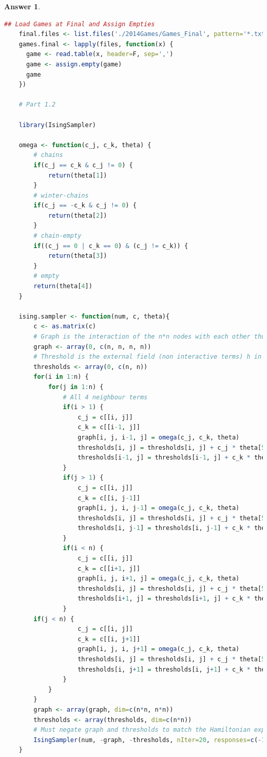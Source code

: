 \documentclass[12pt]{article}
\theoremstyle{colon}
\newtheorem*{answer}{Answer}
\begin{document}
\begin{answer}
\begin{lstlisting}[language=R, basicstyle=\scriptsize, breaklines=true]
    ## Load Games at Final and Assign Empties
    final.files <- list.files('./2014Games/Games_Final', pattern='*.txt', full.names=T, recursive=FALSE)
    games.final <- lapply(files, function(x) {
      game <- read.table(x, header=F, sep=',')
      game <- assign.empty(game)
      game
    })

    # Part 1.2

    library(IsingSampler)

    omega <- function(c_j, c_k, theta) {
        # chains
        if(c_j == c_k & c_j != 0) {
            return(theta[1])
        }
        # winter-chains
        if(c_j == -c_k & c_j != 0) {
            return(theta[2])
        }
        # chain-empty
        if((c_j == 0 | c_k == 0) & (c_j != c_k)) {
            return(theta[3])
        }
        # empty
        return(theta[4])
    }

    ising.sampler <- function(num, c, theta){
        c <- as.matrix(c)
        # Graph is the interaction of the n*n nodes with each other thus, dim = n*n x n*n
        graph <- array(0, c(n, n, n, n))
        # Threshold is the external field (non interactive terms) h in our case
        thresholds <- array(0, c(n, n))
        for(i in 1:n) {
            for(j in 1:n) {
                # All 4 neighbour terms
                if(i > 1) {
                    c_j = c[[i, j]]
                    c_k = c[[i-1, j]]
                    graph[i, j, i-1, j] = omega(c_j, c_k, theta)
                    thresholds[i, j] = thresholds[i, j] + c_j * theta[5]
                    thresholds[i-1, j] = thresholds[i-1, j] + c_k * theta[5]
                }
                if(j > 1) {
                    c_j = c[[i, j]]
                    c_k = c[[i, j-1]]
                    graph[i, j, i, j-1] = omega(c_j, c_k, theta)
                    thresholds[i, j] = thresholds[i, j] + c_j * theta[5]
                    thresholds[i, j-1] = thresholds[i, j-1] + c_k * theta[5]
                }
                if(i < n) {
                    c_j = c[[i, j]]
                    c_k = c[[i+1, j]]
                    graph[i, j, i+1, j] = omega(c_j, c_k, theta)
                    thresholds[i, j] = thresholds[i, j] + c_j * theta[5]
                    thresholds[i+1, j] = thresholds[i+1, j] + c_k * theta[5]
                }
        if(j < n) {
                    c_j = c[[i, j]]
                    c_k = c[[i, j+1]]
                    graph[i, j, i, j+1] = omega(c_j, c_k, theta)
                    thresholds[i, j] = thresholds[i, j] + c_j * theta[5]
                    thresholds[i, j+1] = thresholds[i, j+1] + c_k * theta[5]
                }
            }
        }
        graph <- array(graph, dim=c(n*n, n*n))
        thresholds <- array(thresholds, dim=c(n*n))
        # Must negate graph and thresholds to match the Hamiltonian expected by the Ising model
        IsingSampler(num, -graph, -thresholds, nIter=20, responses=c(-1, 1))
    }


\end{lstlisting}
\end{answer}
\end{document}

